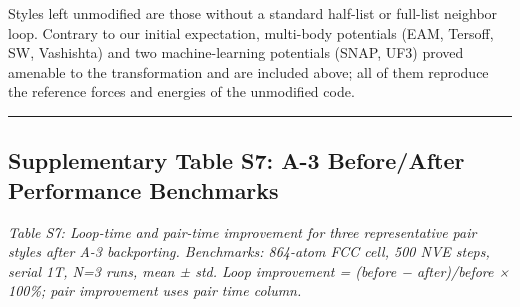 \documentclass[
  11pt,
]{article}
\begin{document}
Styles left unmodified are those without a standard half-list or
full-list neighbor loop. Contrary to our initial expectation, multi-body
potentials (EAM, Tersoff, SW, Vashishta) and two machine-learning
potentials (SNAP, UF3) proved amenable to the transformation and are
included above; all of them reproduce the reference forces and energies
of the unmodified code.

\begin{center}\rule{0.5\linewidth}{0.5pt}\end{center}

\subsection{Supplementary Table S7: A-3 Before/After Performance
Benchmarks}\label{supplementary-table-s7-a-3-beforeafter-performance-benchmarks}

\emph{Table S7: Loop-time and pair-time improvement for three
representative pair styles after A-3 backporting. Benchmarks: 864-atom
FCC cell, 500 NVE steps, serial 1T, N=3 runs, mean ± std. Loop
improvement = (before − after)/before × 100\%; pair improvement uses
pair time column.}
\end{document}
